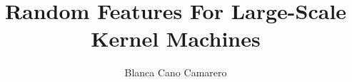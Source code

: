 \title{Random Features For Large-Scale Kernel Machines}
\author{Blanca Cano Camarero}


\relax
{}\relax
{}\relax

\newcommand{\bgcolor}{blue}